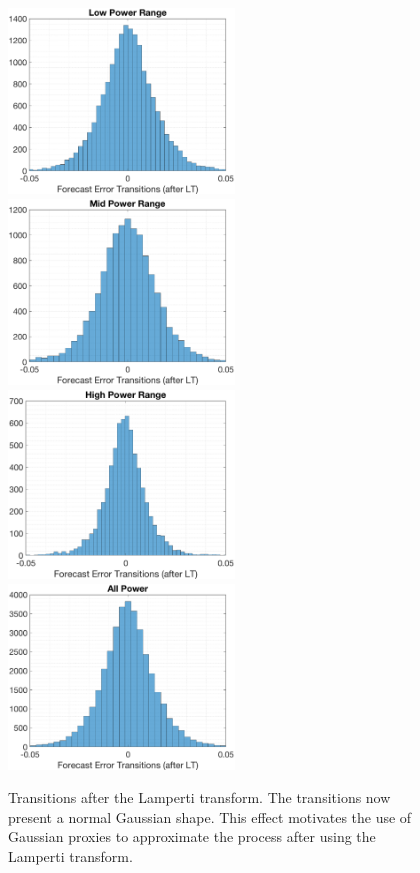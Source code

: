 \documentclass[11pt]{article}
\begin{document}
\begin{figure}
  \includegraphics[width=60mm,scale=1]{plots/LP_t_LP.eps}
  \includegraphics[width=60mm,scale=1]{plots/MP_t_LP.eps}\\
   \includegraphics[width=60mm,scale=1]{plots/HP_t_LP.eps}
  \includegraphics[width=60mm,scale=1]{plots/AP_t_LP.eps}
  \caption{Transitions after the Lamperti transform. The transitions now present a normal Gaussian shape. This effect motivates the use of Gaussian proxies to approximate the process after using the Lamperti transform.}
  \label{fig:LP_transitions}
\end{figure}
\end{document}

